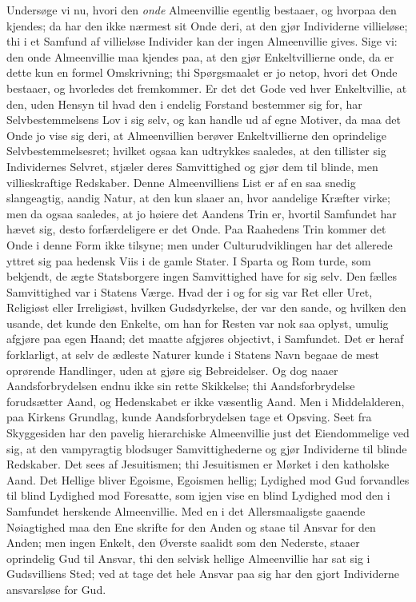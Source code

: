 \documentclass[12pt]{book}
\begin{document}
Undersøge vi nu, hvori den \emph{onde} Almeenvillie egentlig
bestaaer, og hvorpaa den kjendes; da har den ikke nærmest sit Onde
deri, at den gjør Individerne villieløse; thi i et Samfund af
villieløse Individer kan der ingen Almeenvillie gives. Sige vi: den
onde Almeenvillie maa kjendes paa, at den gjør Enkeltvillierne onde,
da er dette kun en formel Omskrivning; thi Spørgsmaalet er
jo netop, hvori det Onde bestaaer, og hvorledes det fremkommer. Er
det det Gode ved hver Enkeltvillie, at den, uden Hensyn til hvad den
i endelig Forstand bestemmer sig for, har Selvbestemmelsens Lov i
sig selv, og kan handle ud af egne Motiver, da maa det Onde jo vise
sig deri, at Almeenvillien berøver Enkeltvillierne den oprindelige
Selvbestemmelsesret; hvilket ogsaa kan udtrykkes saaledes, at den
tillister sig Individernes Selvret, stjæler deres Samvittighed og
gjør dem til blinde, men villieskraftige Redskaber. Denne
Almeenvilliens List er af en saa snedig slangeagtig, aandig Natur,
at den kun slaaer an, hvor aandelige Kræfter virke; men da ogsaa
saaledes, at jo høiere det Aandens Trin er, hvortil Samfundet har
hævet sig, desto forfærdeligere er det Onde. Paa Raahedens Trin
kommer det Onde i denne Form ikke tilsyne; men under
Culturudviklingen har det allerede yttret sig paa hedensk Viis i de
gamle Stater. I Sparta og Rom turde, som bekjendt, de ægte
Statsborgere ingen Samvittighed have for sig selv. Den fælles
Samvittighed var i Statens Værge. Hvad der i og for sig var Ret
eller Uret, Religiøst eller Irreligiøst, hvilken Gudsdyrkelse, der
var den sande, og hvilken den usande, det kunde den Enkelte, om han
for Resten var nok saa oplyst, umulig afgjøre paa egen Haand; det
maatte afgjøres objectivt, i Samfundet. Det er heraf forklarligt, at
selv de ædleste Naturer kunde i Statens Navn begaae de mest
oprørende Handlinger, uden at gjøre sig Bebreidelser. Og dog naaer
Aandsforbrydelsen endnu ikke sin rette Skikkelse; thi
Aandsforbrydelse forudsætter Aand, og Hedenskabet er ikke væsentlig
Aand. Men i Middelalderen, paa Kirkens Grundlag, kunde
Aandsforbrydelsen tage et Opsving. Seet fra Skyggesiden har den
pavelig hierarchiske Almeenvillie just det Eiendommelige ved sig, at
den vampyragtig blodsuger Samvittighederne og gjør Individerne til
blinde Redskaber. Det sees af Jesuitismen; thi Jesuitismen er
Mørket i den katholske Aand. Det Hellige bliver Egoisme, Egoismen
hellig; Lydighed mod Gud forvandles til blind Lydighed mod
Foresatte, som igjen vise en blind Lydighed mod den i Samfundet
herskende Almeenvillie. Med en i det Allersmaaligste gaaende
Nøiagtighed maa den Ene skrifte for den Anden og staae til Ansvar
for den Anden; men ingen Enkelt, den Øverste saalidt som den
Nederste, staaer oprindelig Gud til Ansvar, thi den selvisk hellige
Almeenvillie har sat sig i Gudsvilliens Sted; ved at tage det hele
Ansvar paa sig har den gjort Individerne ansvarsløse for Gud.
\end{document}

